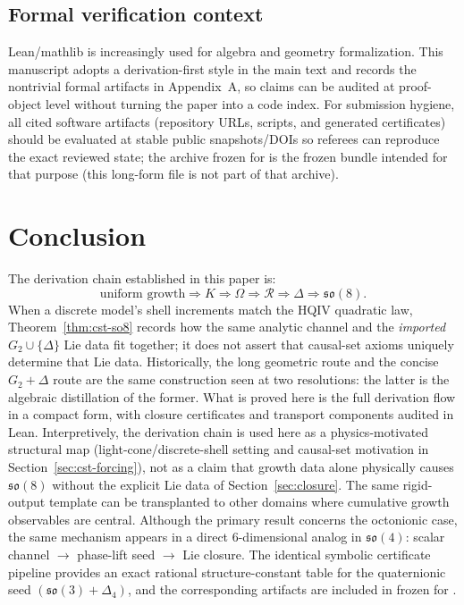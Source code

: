 \documentclass[11pt]{amsart}
\newcommand{\PaperArtifactBundleZip}{\ReleaseDistArchive}
\begin{document}
\subsection*{Formal verification context}
Lean/mathlib is increasingly used for algebra and geometry formalization. This manuscript adopts a derivation-first style in the main text and records the nontrivial formal artifacts in Appendix~A, so claims can be audited at proof-object level without turning the paper into a code index.
For submission hygiene, all cited software artifacts (repository URLs, scripts, and generated certificates) should be evaluated at stable public snapshots/DOIs so referees can reproduce the exact reviewed state; the archive \PaperArtifactBundleZip{} frozen for  is the frozen bundle intended for that purpose (this long-form file is not part of that archive).

\section{Conclusion}

The derivation chain established in this paper is:
\[
\text{uniform growth}\Longrightarrow K\Longrightarrow \Omega\Longrightarrow \mathcal R
\Longrightarrow \Delta
\Longrightarrow \mathfrak{so}(8).
\]
When a discrete model's shell increments match the HQIV quadratic law, Theorem~\ref{thm:cst-so8} records how the same analytic channel and the \emph{imported} \(G_2\cup\{\Delta\}\) Lie data fit together; it does not assert that causal-set axioms uniquely determine that Lie data.
Historically, the long geometric route and the concise \(G_2+\Delta\) route are the same construction seen at two resolutions: the latter is the algebraic distillation of the former. What is proved here is the full derivation flow in a compact form, with closure certificates and transport components audited in Lean.
Interpretively, the derivation chain is used here as a physics-motivated structural map (light-cone/discrete-shell setting and causal-set motivation in Section~\ref{sec:cst-forcing}), not as a claim that growth data alone physically causes \(\mathfrak{so}(8)\) without the explicit Lie data of Section~\ref{sec:closure}. The same rigid-output template can be transplanted to other domains where cumulative growth observables are central.
Although the primary result concerns the octonionic case, the same mechanism appears in a direct 6-dimensional analog in \(\mathfrak{so}(4)\): scalar channel \(\rightarrow\) phase-lift seed \(\rightarrow\) Lie closure. The identical symbolic certificate pipeline provides an exact rational structure-constant table for the quaternionic seed \((\mathfrak{so}(3)+\Delta_4)\), and the corresponding artifacts are included in \PaperArtifactBundleZip{} frozen for .
\end{document}
